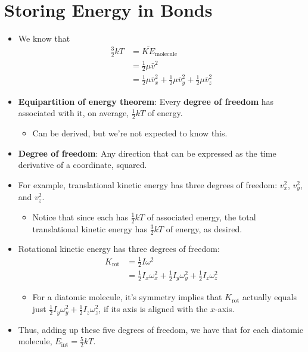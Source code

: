 \documentclass[../notes.tex]{subfiles}
\begin{document}
\section{Storing Energy in Bonds}
\begin{itemize}
    \item We know that
    \begin{align*}
        \frac{3}{2}kT &= \overline{KE}_\text{molecule}\\
        &= \frac{1}{2}\mu\bar{v}^2\\
        &= \frac{1}{2}\mu\bar{v}_x^2+\frac{1}{2}\mu\bar{v}_y^2+\frac{1}{2}\mu\bar{v}_z^2
    \end{align*}
    \item \textbf{Equipartition of energy theorem}: Every \textbf{degree of freedom} has associated with it, on average, $\frac{1}{2}kT$ of energy.
    \begin{itemize}
        \item Can be derived, but we're not expected to know this.
    \end{itemize}
    \item \textbf{Degree of freedom}: Any direction that can be expressed as the time derivative of a coordinate, squared.
    \item For example, translational kinetic energy has three degrees of freedom: $v_x^2$, $v_y^2$, and $v_z^2$.
    \begin{itemize}
        \item Notice that since each has $\frac{1}{2}kT$ of associated energy, the total translational kinetic energy has $\frac{3}{2}kT$ of energy, as desired.
    \end{itemize}
    \item Rotational kinetic energy has three degrees of freedom:
    \begin{align*}
        K_\text{rot} &= \frac{1}{2}I\omega^2\\
        &= \frac{1}{2}I_x\omega_x^2+\frac{1}{2}I_y\omega_y^2+\frac{1}{2}I_z\omega_z^2
    \end{align*}
    \begin{itemize}
        \item For a diatomic molecule, it's symmetry implies that $K_\text{rot}$ actually equals just $\frac{1}{2}I_y\omega_y^2+\frac{1}{2}I_z\omega_z^2$, if its axis is aligned with the $x$-axis.
    \end{itemize}
    \item Thus, adding up these five degrees of freedom, we have that for each diatomic molecule, $E_\text{int}=\frac{5}{2}kT$.

\end{itemize}
\end{document}

